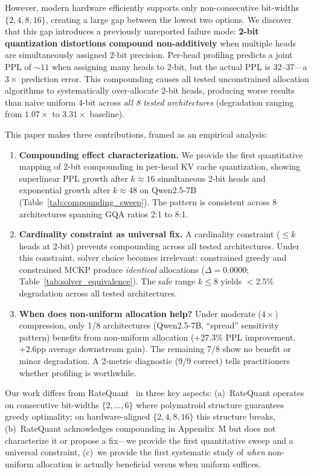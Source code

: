 \documentclass[11pt,a4paper]{article}
\begin{document}
However, modern hardware efficiently supports only non-consecutive bit-widths $\{2,4,8,16\}$, creating a large gap between the lowest two options.
We discover that this gap introduces a previously unreported failure mode: \textbf{2-bit quantization distortions compound non-additively} when multiple heads are simultaneously assigned 2-bit precision.
Per-head profiling predicts a joint PPL of ${\sim}11$ when assigning many heads to 2-bit, but the actual PPL is 32--37---a $3\times$ prediction error.
This compounding causes all tested unconstrained allocation algorithms to systematically over-allocate 2-bit heads, producing worse results than naive uniform 4-bit across \emph{all 8 tested architectures} (degradation ranging from $1.07\times$ to $3.31\times$ baseline).

This paper makes three contributions, framed as an empirical analysis:

\begin{enumerate}[leftmargin=*,itemsep=2pt]
\item \textbf{Compounding effect characterization.} We provide the first quantitative mapping of 2-bit compounding in per-head KV cache quantization, showing superlinear PPL growth after $k \approx 16$ simultaneous 2-bit heads and exponential growth after $k \approx 48$ on Qwen2.5-7B (Table~\ref{tab:compounding_sweep}).
The pattern is consistent across 8 architectures spanning GQA ratios 2:1 to 8:1.

\item \textbf{Cardinality constraint as universal fix.} A cardinality constraint ($\le k$ heads at 2-bit) prevents compounding across all tested architectures.
Under this constraint, solver choice becomes irrelevant: constrained greedy and constrained MCKP produce \emph{identical} allocations ($\Delta = 0.0000$; Table~\ref{tab:solver_equivalence}).
The safe range $k \le 8$ yields $<2.5\%$ degradation across all tested architectures.

\item \textbf{When does non-uniform allocation help?} Under moderate ($4\times$) compression, only 1/8 architectures (Qwen2.5-7B, ``spread'' sensitivity pattern) benefits from non-uniform allocation (+27.3\% PPL improvement, +2.6pp average downstream gain).
The remaining 7/8 show no benefit or minor degradation.
A 2-metric diagnostic (9/9 correct) tells practitioners whether profiling is worthwhile.
\end{enumerate}

Our work differs from RateQuant~\cite{ratequant2024} in three key aspects: (a)~RateQuant operates on consecutive bit-widths $\{2,\ldots,6\}$ where polymatroid structure guarantees greedy optimality; on hardware-aligned $\{2,4,8,16\}$ this structure breaks, (b)~RateQuant acknowledges compounding in Appendix~M but does not characterize it or propose a fix---we provide the first quantitative sweep and a universal constraint, (c)~we provide the first systematic study of \emph{when} non-uniform allocation is actually beneficial versus when uniform suffices.
\end{document}
